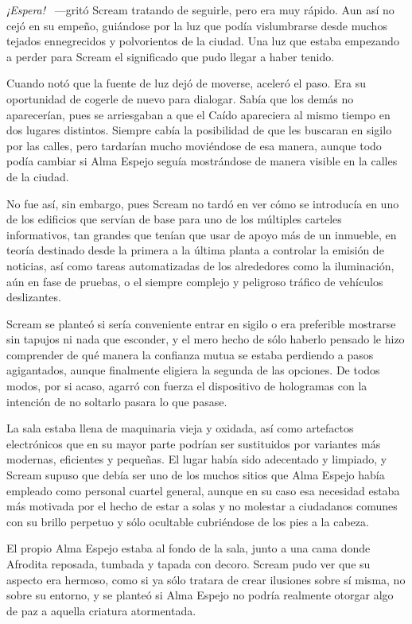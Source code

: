 \emph{¡Espera!} ~---gritó Scream tratando de seguirle, pero era muy rápido. Aun así no cejó en su empeño, guiándose por la luz que podía vislumbrarse desde muchos tejados ennegrecidos y polvorientos de la ciudad. Una luz que estaba empezando a perder para Scream el significado que pudo llegar a haber tenido.

Cuando notó que la fuente de luz dejó de moverse, aceleró el paso. Era su oportunidad de cogerle de nuevo para dialogar. Sabía que los demás no aparecerían, pues se arriesgaban a que el Caído apareciera al mismo tiempo en dos lugares distintos. Siempre cabía la posibilidad de que les buscaran en sigilo por las calles, pero tardarían mucho moviéndose de esa manera, aunque todo podía cambiar si Alma Espejo seguía mostrándose de manera visible en la calles de la ciudad.

No fue así, sin embargo, pues Scream no tardó en ver cómo se introducía en uno de los edificios que servían de base para uno de los múltiples carteles informativos, tan grandes que tenían que usar de apoyo más de un inmueble, en teoría destinado desde la primera a la última planta a controlar la emisión de noticias, así como tareas automatizadas de los alrededores como la iluminación, aún en fase de pruebas, o el siempre complejo y peligroso tráfico de vehículos deslizantes.

Scream se planteó si sería conveniente entrar en sigilo o era preferible mostrarse sin tapujos ni nada que esconder, y el mero hecho de sólo haberlo pensado le hizo comprender de qué manera la confianza mutua se estaba perdiendo a pasos agigantados, aunque finalmente eligiera la segunda de las opciones. De todos modos, por si acaso, agarró con fuerza el dispositivo de hologramas con la intención de no soltarlo pasara lo que pasase.

La sala estaba llena de maquinaria vieja y oxidada, así como artefactos electrónicos que en su mayor parte podrían ser sustituidos por variantes más modernas, eficientes y pequeñas. El lugar había sido adecentado y limpiado, y Scream supuso que debía ser uno de los muchos sitios que Alma Espejo había empleado como personal cuartel general, aunque en su caso esa necesidad estaba más motivada por el hecho de estar a solas y no molestar a ciudadanos comunes con su brillo perpetuo y sólo ocultable cubriéndose de los pies a la cabeza.

El propio Alma Espejo estaba al fondo de la sala, junto a una cama donde Afrodita reposada, tumbada y tapada con decoro. Scream pudo ver que su aspecto era hermoso, como si ya sólo tratara de crear ilusiones sobre sí misma, no sobre su entorno, y se planteó si Alma Espejo no podría realmente otorgar algo de paz a aquella criatura atormentada.

